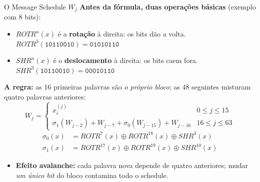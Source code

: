 \documentclass{beamer}
\begin{document}
\begin{frame}{O Message Schedule \texorpdfstring{$W_j$}{Wj}}
    \textbf{Antes da fórmula, duas operações básicas} (exemplo com 8 bits):
    \begin{itemize}
        \footnotesize
        \item $ROTR^{n}(x)$ é a \textbf{rotação} à direita: os bits dão a volta. \quad $ROTR^{3}(\texttt{10110010}) = \texttt{01010110}$
        \item $SHR^{n}(x)$ é o \textbf{deslocamento} à direita: os bits caem fora. \quad $SHR^{3}(\texttt{10110010}) = \texttt{00010110}$
    \end{itemize}
    \smallskip
    \textbf{A regra:} as 16 primeiras palavras são \textit{o próprio bloco}; as 48 seguintes misturam quatro palavras anteriores:
    \[
        W_j =
        \begin{cases}
            x_i^{(j)} & 0 \le j \le 15\\[4pt]
            \sigma_1(W_{j-2}) + W_{j-7} + \sigma_0(W_{j-15}) + W_{j-16} & 16 \le j \le 63
        \end{cases}
    \]
    \vspace{-0.8em}
    \begin{align*}
        \sigma_0(x) &= ROTR^{7}(x) \oplus ROTR^{18}(x) \oplus SHR^{3}(x)\\
        \sigma_1(x) &= ROTR^{17}(x) \oplus ROTR^{19}(x) \oplus SHR^{10}(x)
    \end{align*}
    \begin{itemize}
        \footnotesize
        \item \textbf{Efeito avalanche:} cada palavra nova depende de quatro anteriores; mudar \textit{um único bit} do bloco contamina todo o schedule.
    \end{itemize}
\end{frame}
\end{document}
